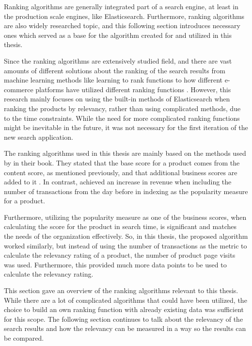 Ranking algorithms are generally integrated part of a search engine, at least in
the production scale engines, like Elasticsearch.
Furthermore, ranking algorithms are also widely researched topic, and this following
section introduces necessary ones which served as a base for the 
algorithm created for and utilized in this thesis.

Since the ranking algorithms are extensively studied field, and there are vast amounts of different solutions
about the ranking of the search results from machine learning methods like learning to rank functions
\cite{l2rEntitiesWeb, learningRankEC} to how different e-commerce platforms have utilized different ranking
functions \cite{amazonJoyRanking, predictionRelevanceSearchResults, turningClickPurhases}.
However, this research mainly focuses on using the built-in methods of Elasticsearch
when ranking the products by relevancy, rather than using complicated methods, due to the time constraints.
While the need for more complicated ranking functions might be inevitable in the future,
it was not necessary for the first iteration of the new search application.


The ranking algorithms used in this thesis are mainly based on the methods used by
\citeauthor{relevantSearch} \cite{relevantSearch} in their book.
They stated that the base score for a product comes from the content score, as mentioned previously,
and that additional business scores are added to it \cite{relevantSearch}.
In contrast, \citeauthor{enhancingSearchBestSelling} \cite{enhancingSearchBestSelling} achieved an 
increase in revenue when including the number of transactions from the day before in indexing
as the popularity measure for a product.

Furthermore, utilizing the popularity measure as one of the business scores, 
when calculating the score for the product in search time,
is significant and matches the needs of the organization effectively.
So, in this thesis, the proposed algorithm worked similarly, but instead of using the number of transactions
as the metric to calculate the relevancy rating of a product, the number of product page visits was used.
Furthermore, this provided much more data points to be used to calculate the relevancy rating.

This section gave an overview of the ranking algorithms relevant to this thesis. 
While there are a lot of complicated algorithms that could have been utilized, the choice to
build an own ranking function with already existing data was sufficient for this scope.
The following section continues to talk about the relevancy of the search results 
and how the relevancy can be measured in a way so the results can be compared.


